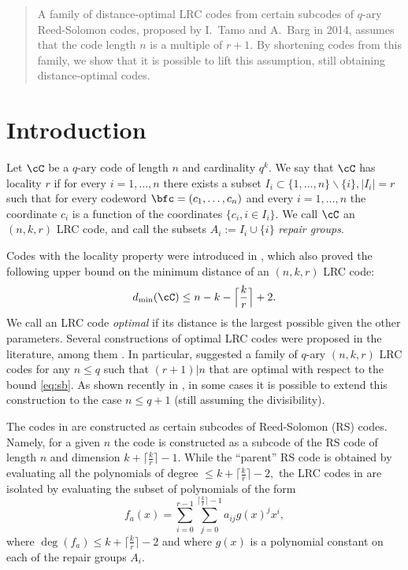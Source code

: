 \documentclass{IEEEtran}
\newcounter{construction}[section]
\begin{document}
\renewcommand{\thefootnote}{\arabic{footnote}}
\setcounter{footnote}{0}

\begin{abstract}
A family of distance-optimal LRC codes from certain subcodes of $q$-ary Reed-Solomon codes, proposed by I.~Tamo and A.~Barg in 2014, assumes that the code length $n$ is a multiple of $r+1.$ By shortening codes from this family, we show that it is possible to lift this assumption, still obtaining distance-optimal codes. 
\end{abstract}





\section{Introduction}
Let $\cC$ be a $q$-ary code of length $n$ and cardinality $q^k$. We say that $\cC$ has locality $r$ if for every $i=1,\dots,n$
there exists a subset $I_i\subset\{1,\dots,n\}\backslash\{i\}, |I_i|=r$ such that for every codeword 
$\bfc=(c_1,\dots,c_n)$ and every $i=1,\dots,n$ the coordinate $c_i$ is a function
of the coordinates $\{c_i,i\in I_i\}.$ We call $\cC$ an $(n,k,r)$ LRC code, and call the subsets $A_i:=I_i\cup\{i\}$ {\em repair groups}.

Codes with the locality property were introduced in \cite{OnTheLocality}, which also proved the following upper bound on the minimum
distance of an $(n,k,r)$ LRC code:
  \begin{equation}\label{eq:sb}
  d_{\text{min}}(\cC)\le n-k-\Big\lceil \frac kr\Big\rceil+2.
  \end{equation}
We call an LRC code {\em optimal} if its distance is the largest possible given the other parameters. 
Several constructions of optimal LRC codes were proposed in the literature, among them   
\cite{prakash2012optimal,sil13,TPG13,OptimalLRC,LiMaXing17b,MaGe17,LiuMesnagerChen18}. In particular, \cite{OptimalLRC}
suggested a family of $q$-ary $(n,k,r)$ LRC codes for any $n\le q$ such that $(r+1)|n$ that are optimal with respect to the bound
\eqref{eq:sb}.
As shown recently in \cite{JinMaXing17}, in some cases it is possible to extend this construction to the case $n\le q+1$ (still assuming the divisibility).
  
The codes in \cite{OptimalLRC} are constructed as certain subcodes of Reed-Solomon (RS) codes. Namely, for a given $n$ 
the code is constructed as a subcode of the RS code of length $n$ and dimension $k+\lceil\frac kr\rceil-1.$
While the ``parent'' RS code is obtained by evaluating all the polynomials of degree $\le k+\lceil\frac kr\rceil-2,$ the LRC codes in \cite{OptimalLRC} are isolated by evaluating the subset of polynomials of the form 
   $$
   f_a(x)=\sum_{i=0}^{r-1}\sum_{j=0}^{\lceil\frac kr\rceil-1}a_{ij}g(x)^j x^i,
   $$
 where $\deg(f_a)\le k+\lceil\frac kr\rceil-2$ and where $g(x)$ is a polynomial constant on each of the repair groups $A_i.$
 
\end{document}
